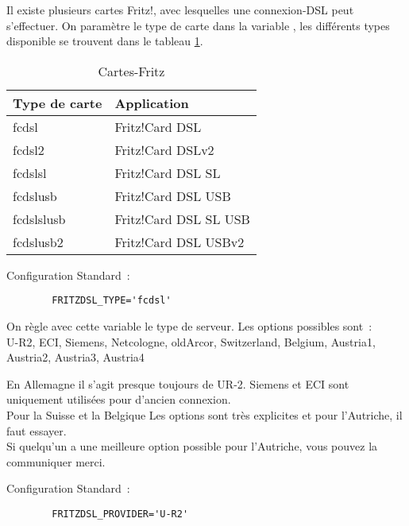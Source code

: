 \begin{description}




Il existe plusieurs cartes Fritz!, avec lesquelles une connexion-DSL
peut s'effectuer. On paramètre le type de carte dans la variable
, les différents types disponible se trouvent
dans le tableau \ref{tab:fritz-karten}.

\begin{table}[htb]
  \centering
  \begin{tabular}{l|l}
    Type de carte & Application \\
    \hline
    fcdsl & Fritz!Card DSL \\
    fcdsl2 & Fritz!Card DSLv2\\
    fcdslsl & Fritz!Card DSL SL\\
    fcdslusb & Fritz!Card DSL USB\\
    fcdslslusb & Fritz!Card DSL SL USB\\
    fcdslusb2 & Fritz!Card DSL USBv2
  \end{tabular}
  \caption{Cartes-Fritz}
  \label{tab:fritz-karten}
\end{table}

        Configuration Standard~:

\begin{example}
\begin{verbatim}
        FRITZDSL_TYPE='fcdsl'
\end{verbatim}
\end{example}


On règle avec cette variable le type de serveur. Les options possibles sont~:\\
U-R2, ECI, Siemens, Netcologne, oldArcor, Switzerland, Belgium,
Austria1, Austria2, Austria3, Austria4

En Allemagne il s'agit presque toujours de UR-2. Siemens et ECI sont
uniquement utilisées pour d'ancien connexion.\\
Pour la Suisse et la Belgique Les options sont très explicites et pour
l'Autriche, il faut essayer.\\
Si quelqu'un a une meilleure option possible pour l'Autriche, vous pouvez
la communiquer merci.

        Configuration Standard~:

\begin{example}
\begin{verbatim}
        FRITZDSL_PROVIDER='U-R2'
\end{verbatim}
\end{example}

\end{description}

